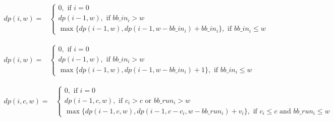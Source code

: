 \begin{strip}
        \begin{align}
                dp(i, w) = & 
                \left\{
                        \begin{array}{l}
                                0, \text{ if $i=0$ } \\ [0.4em]
                                dp(i-1, w), \text{ if $bb\_in_i > w$} \\ [0.4em]
                                \max \{ dp(i-1, w), dp(i-1, w-bb\_in_i) + bb\_in_i \}, \text{ if $bb\_in_i \leq w$}
                        \end{array} 
                \right.
                \label{Equ:MaxTransferDataRecursion} 
        \end{align}
\end{strip}
\begin{strip}
        \begin{align}
                dp(i, w) = &
                \left\{
                        \begin{array}{l}
                                0, \text{ if $i=0$ } \\ [0.4em]
                                dp(i-1, w), \text{ if $bb\_in_i > w$} \\ [0.4em]
                                \max \{ dp(i-1, w), dp(i-1, w-bb\_in_i) + 1 \}, \text{ if $bb\_in_i \leq w$}
                        \end{array} 
                \right.
                \label{Equ:MaxTaskNumberRecursion}
        \end{align}
\end{strip}
\begin{strip}
        \begin{align}
                dp(i, c, w) = &
                \left\{
                        \begin{array}{l}
                                0, \text{ if $i=0$ } \\ [0.4em]
                                dp(i-1, c, w), \text{ if $c_i > c$ or $bb\_run_i > w$} \\ [0.4em]
                                \max \{ dp(i-1, c, w), dp(i-1, c - c_i, w - bb\_run_i) + v_i \}, \text{ if $c_i \leq c$ and $bb\_run_i \leq w$}
                        \end{array} 
                \right.
                \label{Equ:MaxProductRecursion}
        \end{align}
\end{strip}

